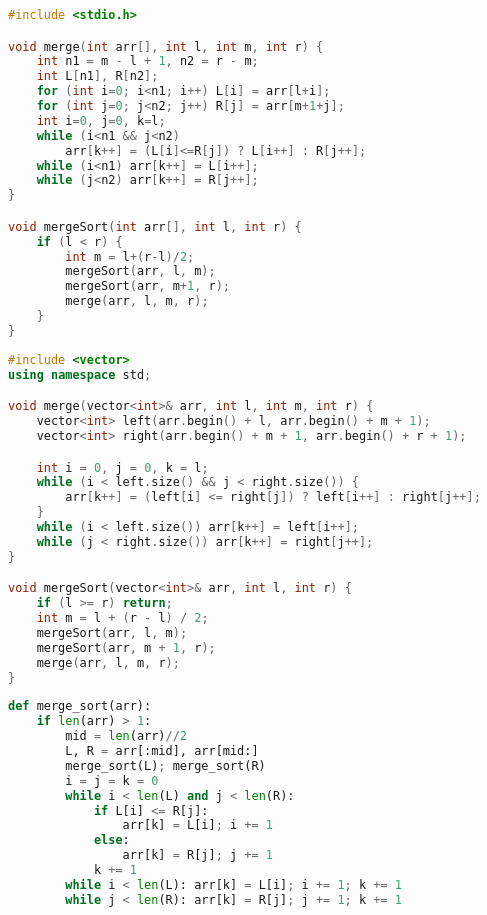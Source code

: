 \begin{lstlisting}[language=C, caption={Implementação do Merge Sort em C}, label=code:mergeSort]
#include <stdio.h>

void merge(int arr[], int l, int m, int r) {
    int n1 = m - l + 1, n2 = r - m;
    int L[n1], R[n2];
    for (int i=0; i<n1; i++) L[i] = arr[l+i];
    for (int j=0; j<n2; j++) R[j] = arr[m+1+j];
    int i=0, j=0, k=l;
    while (i<n1 && j<n2)
        arr[k++] = (L[i]<=R[j]) ? L[i++] : R[j++];
    while (i<n1) arr[k++] = L[i++];
    while (j<n2) arr[k++] = R[j++];
}

void mergeSort(int arr[], int l, int r) {
    if (l < r) {
        int m = l+(r-l)/2;
        mergeSort(arr, l, m);
        mergeSort(arr, m+1, r);
        merge(arr, l, m, r);
    }
}
\end{lstlisting}

\begin{lstlisting}[language=C++,caption={Merge sort em C++},captionpos=t]
#include <vector>
using namespace std;

void merge(vector<int>& arr, int l, int m, int r) {
    vector<int> left(arr.begin() + l, arr.begin() + m + 1);
    vector<int> right(arr.begin() + m + 1, arr.begin() + r + 1);

    int i = 0, j = 0, k = l;
    while (i < left.size() && j < right.size()) {
        arr[k++] = (left[i] <= right[j]) ? left[i++] : right[j++];
    }
    while (i < left.size()) arr[k++] = left[i++];
    while (j < right.size()) arr[k++] = right[j++];
}

void mergeSort(vector<int>& arr, int l, int r) {
    if (l >= r) return;
    int m = l + (r - l) / 2;
    mergeSort(arr, l, m);
    mergeSort(arr, m + 1, r);
    merge(arr, l, m, r);
}
\end{lstlisting}

\begin{lstlisting}[language=Python, caption={Merge Sort em Python}, label=code:mergeSortPy]
def merge_sort(arr):
    if len(arr) > 1:
        mid = len(arr)//2
        L, R = arr[:mid], arr[mid:]
        merge_sort(L); merge_sort(R)
        i = j = k = 0
        while i < len(L) and j < len(R):
            if L[i] <= R[j]:
                arr[k] = L[i]; i += 1
            else:
                arr[k] = R[j]; j += 1
            k += 1
        while i < len(L): arr[k] = L[i]; i += 1; k += 1
        while j < len(R): arr[k] = R[j]; j += 1; k += 1
\end{lstlisting}


